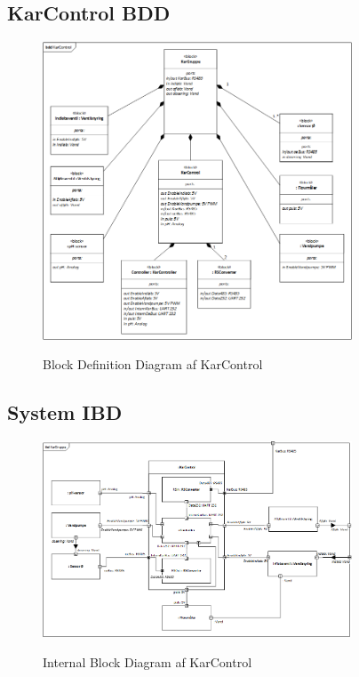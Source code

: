 
\subsection{KarControl BDD}

\begin{figure}[H]
	\centering
	\includegraphics[width=0.82\textwidth]{Systemarkitektur/KarControl/KarControl_BDD.png}
	\label{fig:KarControl BDD}
	\caption{Block Definition Diagram af KarControl}
\end{figure}



\subsection{System IBD}

\begin{figure}[H]
	\centering
	\includegraphics[width=0.82\textwidth]{Systemarkitektur/KarControl/KarControl_IBD.png}
	\label{fig:KarControl IBD}
	\caption{Internal Block Diagram af KarControl}
\end{figure}

